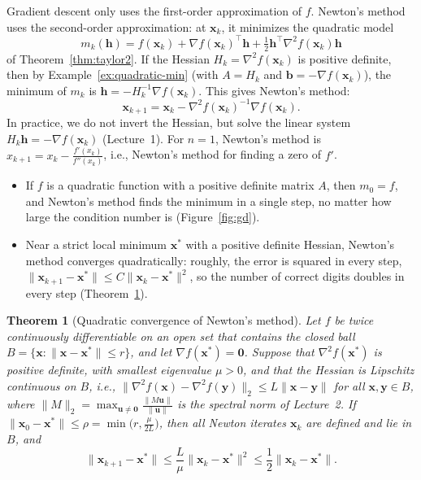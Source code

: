 \documentclass[11pt]{article}
\newcommand{\norm}[1]{\lVert #1 \rVert}
\theoremstyle{definition}
\theoremstyle{plain}
\newtheorem{theorem}[definition]{Theorem}
\theoremstyle{remark}
\begin{document}
Gradient descent only uses the first-order approximation of $f$. Newton's method uses the second-order approximation: at $\mathbf{x}_k$, it minimizes the quadratic model
\[m_k(\mathbf{h}) = f(\mathbf{x}_k) + \nabla f(\mathbf{x}_k)^\top\mathbf{h} + \tfrac{1}{2}\mathbf{h}^\top\nabla^2 f(\mathbf{x}_k)\mathbf{h}\]
of Theorem~\ref{thm:taylor2}. If the Hessian $H_k = \nabla^2 f(\mathbf{x}_k)$ is positive definite, then by Example~\ref{ex:quadratic-min} (with $A = H_k$ and $\mathbf{b} = -\nabla f(\mathbf{x}_k)$), the minimum of $m_k$ is $\mathbf{h} = -H_k^{-1}\nabla f(\mathbf{x}_k)$. This gives Newton's method:
\[\mathbf{x}_{k+1} = \mathbf{x}_k - \nabla^2 f(\mathbf{x}_k)^{-1}\nabla f(\mathbf{x}_k).\]
In practice, we do not invert the Hessian, but solve the linear system $H_k\mathbf{h} = -\nabla f(\mathbf{x}_k)$ (Lecture~1). For $n = 1$, Newton's method is $x_{k+1} = x_k - \frac{f'(x_k)}{f''(x_k)}$, i.e., Newton's method for finding a zero of $f'$.
\begin{itemize}
    \item If $f$ is a quadratic function with a positive definite matrix $A$, then $m_0 = f$, and Newton's method finds the minimum in a single step, no matter how large the condition number is (Figure~\ref{fig:gd}).
    \item Near a strict local minimum $\mathbf{x}^*$ with a positive definite Hessian, Newton's method converges quadratically: roughly, the error is squared in every step, $\norm{\mathbf{x}_{k+1} - \mathbf{x}^*} \leq C\norm{\mathbf{x}_k - \mathbf{x}^*}^2$, so the number of correct digits doubles in every step (Theorem~\ref{thm:newton}).
\end{itemize}

\begin{theorem}[Quadratic convergence of Newton's method]\label{thm:newton}
    Let $f$ be twice continuously differentiable on an open set that contains the closed ball $B = \{\mathbf{x} : \norm{\mathbf{x} - \mathbf{x}^*} \leq r\}$, and let $\nabla f(\mathbf{x}^*) = \mathbf{0}$. Suppose that $\nabla^2 f(\mathbf{x}^*)$ is positive definite, with smallest eigenvalue $\mu > 0$, and that the Hessian is Lipschitz continuous on $B$, i.e., $\norm{\nabla^2 f(\mathbf{x}) - \nabla^2 f(\mathbf{y})}_2 \leq L\norm{\mathbf{x} - \mathbf{y}}$ for all $\mathbf{x}, \mathbf{y} \in B$, where $\norm{M}_2 = \max_{\mathbf{u} \neq \mathbf{0}} \frac{\norm{M\mathbf{u}}}{\norm{\mathbf{u}}}$ is the spectral norm of Lecture~2. If $\norm{\mathbf{x}_0 - \mathbf{x}^*} \leq \rho = \min\big(r, \frac{\mu}{2L}\big)$, then all Newton iterates $\mathbf{x}_k$ are defined and lie in $B$, and
    \[\norm{\mathbf{x}_{k+1} - \mathbf{x}^*} \leq \frac{L}{\mu}\norm{\mathbf{x}_k - \mathbf{x}^*}^2 \leq \frac{1}{2}\norm{\mathbf{x}_k - \mathbf{x}^*}.\]
\end{theorem}
\end{document}
